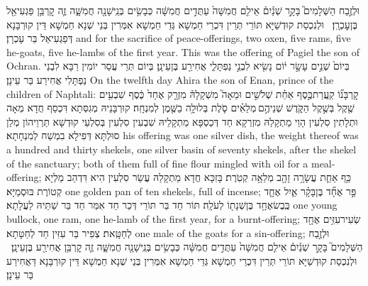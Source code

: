 {וּלְזֶ֣בַח הַשְּׁלָמִים֮ בָּקָ֣ר שְׁנַ֒יִם֒ אֵילִ֤ם חֲמִשָּׁה֙ עַתֻּדִ֣ים חֲמִשָּׁ֔ה כְּבָשִׂ֥ים בְּנֵֽי\maqqaf שָׁנָ֖ה חֲמִשָּׁ֑ה זֶ֛ה קׇרְבַּ֥ן פַּגְעִיאֵ֖ל בֶּן\maqqaf עׇכְרָֽן׃ \petucha }
{וּלְנִכְסַת קוּדְשַׁיָּא תּוֹרֵי תְּרֵין דִּכְרֵי חַמְשָׁא גְּדֵי חַמְשָׁא אִמְּרִין בְּנֵי שְׁנָא חַמְשָׁא דֵּין קוּרְבָּנָא דְּפַגְעִיאֵל בַּר עָכְרָן׃}
{and for the sacrifice of peace-offerings, two oxen, five rams, five he-goats, five he-lambs of the first year. This was the offering of Pagiel the son of Ochran.}{}
{בְּיוֹם֙ שְׁנֵ֣ים עָשָׂ֣ר י֔וֹם נָשִׂ֖יא לִבְנֵ֣י נַפְתָּלִ֑י אֲחִירַ֖ע בֶּן\maqqaf עֵינָֽן׃}
{בְּיוֹם תְּרֵי עֲסַר יוֹמִין רַבָּא לִבְנֵי נַפְתָּלִי אֲחִירַע בַּר עֵינָן׃}
{On the twelfth day Ahira the son of Enan, prince of the children of Naphtali:}{}
{קׇרְבָּנ֞וֹ קַֽעֲרַת\maqqaf כֶּ֣סֶף אַחַ֗ת שְׁלֹשִׁ֣ים וּמֵאָה֮ מִשְׁקָלָהּ֒ מִזְרָ֤ק אֶחָד֙ כֶּ֔סֶף שִׁבְעִ֥ים שֶׁ֖קֶל בְּשֶׁ֣קֶל הַקֹּ֑דֶשׁ שְׁנֵיהֶ֣ם \legarmeh  מְלֵאִ֗ים סֹ֛לֶת בְּלוּלָ֥ה בַשֶּׁ֖מֶן לְמִנְחָֽה׃}
{קוּרְבָּנֵיהּ מְגִסְּתָא דִּכְסַף חֲדָא מְאָה וּתְלָתִין סִלְעִין הָוֵי מַתְקָלַהּ מִזְרְקָא חַד דְּכַסְפָּא מַתְקָלֵיהּ שִׁבְעִין סִלְעִין בְּסִלְעֵי קוּדְשָׁא תַּרְוֵיהוֹן מְלַן סוּלְתָּא דְּפִילָא בִמְשַׁח לְמִנְחָתָא׃}
{his offering was one silver dish, the weight thereof was a hundred and thirty shekels, one silver basin of seventy shekels, after the shekel of the sanctuary; both of them full of fine flour mingled with oil for a meal-offering;}{}
{כַּ֥ף אַחַ֛ת עֲשָׂרָ֥ה זָהָ֖ב מְלֵאָ֥ה קְטֹֽרֶת׃}
{בָּזִכָּא חֲדָא מַתְקָלַהּ עֲשַׂר סִלְעִין הִיא דִּדְהַב מַלְיָא קְטוֹרֶת בּוּסְמַיָּא׃}
{one golden pan of ten shekels, full of incense;}{}
{פַּ֣ר אֶחָ֞ד בֶּן\maqqaf בָּקָ֗ר אַ֧יִל אֶחָ֛ד כֶּֽבֶשׂ\maqqaf אֶחָ֥ד בֶּן\maqqaf שְׁנָת֖וֹ לְעֹלָֽה׃}
{תּוֹר חַד בַּר תּוֹרֵי דְּכַר חַד אִמַּר חַד בַּר שַׁתֵּיהּ לַעֲלָתָא׃}
{one young bullock, one ram, one he-lamb of the first year, for a burnt-offering;}{}
{שְׂעִיר\maqqaf עִזִּ֥ים אֶחָ֖ד לְחַטָּֽאת׃}
{צְפִיר בַּר עִזִּין חַד לְחַטָּתָא׃}
{one male of the goats for a sin-offering;}{}
{וּלְזֶ֣בַח הַשְּׁלָמִים֮ בָּקָ֣ר שְׁנַ֒יִם֒ אֵילִ֤ם חֲמִשָּׁה֙ עַתֻּדִ֣ים חֲמִשָּׁ֔ה כְּבָשִׂ֥ים בְּנֵֽי\maqqaf שָׁנָ֖ה חֲמִשָּׁ֑ה זֶ֛ה קׇרְבַּ֥ן אֲחִירַ֖ע בֶּן\maqqaf עֵינָֽן׃ \petucha }
{וּלְנִכְסַת קוּדְשַׁיָּא תּוֹרֵי תְּרֵין דִּכְרֵי חַמְשָׁא גְּדֵי חַמְשָׁא אִמְּרִין בְּנֵי שְׁנָא חַמְשָׁא דֵּין קוּרְבָּנָא דַּאֲחִירַע בַּר עֵינָן׃}
